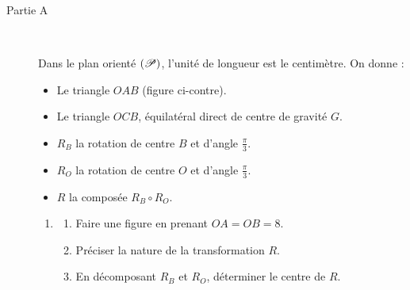       \begin{description}
            \item[Partie A]~\par 
                  \begin{minipage}{0.65\actualtextwidth}
                        Dans le plan orient\'e $(\mathscr{P})$, l'unit\'e de longueur est le centim\`etre.
                        On donne :
                        \begin{itemize}
                              \item Le triangle $OAB$ (figure ci-contre).
                              \item Le triangle $OCB$, \'equilat\'eral direct de centre de gravit\'e $G$.
                              \item $R_B$ la rotation de centre $B$ et d'angle $\frac{\pi}{3}$.
                              \item $R_O$ la rotation de centre $O$ et d'angle $\frac{\pi}{3}$.
                              \item $R$ la compos\'ee $R_B \circ R_O$.
                        \end{itemize}
                  \end{minipage}
                  \begin{minipage}{0.25\actualtextwidth}
                        \begin{flushright}
                        \end{flushright}
                  \end{minipage}
            \begin{enumerate}
                  \item \begin{enumerate}
                              \item Faire une figure en prenant $OA = OB = 8$.
                              \item Pr\'eciser la nature de la transformation $R$.
                              \item En d\'ecomposant $R_B$ et $R_O$, d\'eterminer le centre de $R$.

\end{enumerate}
\end{enumerate}
\end{description}
